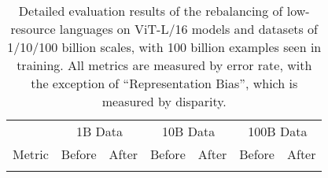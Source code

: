 {\footnotesize

\begin{longtable}{l|rr|rr|rr} 
\caption{Detailed evaluation results of the rebalancing of low-resource languages on ViT-L/16 models and datasets of 1/10/100 billion scales, with 100 billion examples seen in training. All metrics are measured by error rate, with the exception of ``Representation Bias'', which is measured by disparity.}
\label{tab:lang_rebalance_all} \\

\toprule
& \multicolumn{2}{c}{1B Data} & \multicolumn{2}{|c|}{10B Data} & \multicolumn{2}{c}{100B Data} \\
\cmidrule(lr){2-3}\cmidrule(lr){4-5}\cmidrule(lr){6-7}
Metric & Before & After & Before & After & Before & After \\ 
\midrule
\endfirsthead  %

\endhead  %

\endfoot  %

\bottomrule
\endlastfoot %


\end{longtable}}
